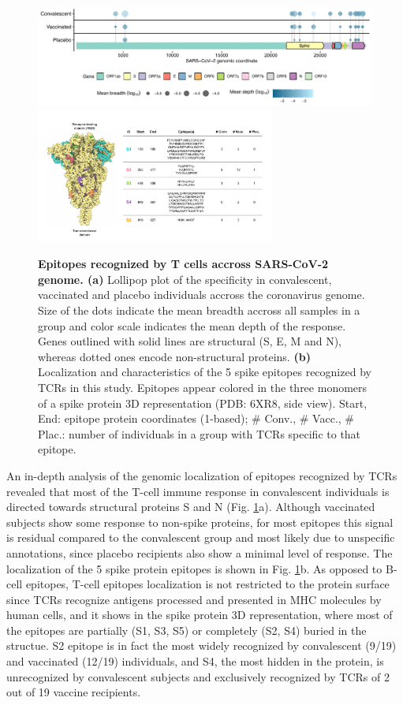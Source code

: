 \begin{figure}[t]
	\centering
	\includegraphics[width=\textwidth,keepaspectratio]{figures/hits.pdf}
	\includegraphics[width=0.7\textwidth,keepaspectratio]{figures/spike_w_table.pdf}
	\caption{\textbf{Epitopes recognized by T cells accross SARS-CoV-2 genome. (a)} Lollipop plot of the \TCRB{} \covid{} specificity in convalescent, vaccinated and placebo individuals accross the coronavirus genome. Size of the dots indicate the mean breadth accross all samples in a group and color scale indicates the mean depth of the response. Genes outlined with solid lines are structural (S, E, M and N), whereas dotted ones encode non-structural proteins. \textbf{(b)} Localization and characteristics of the 5 \covid{} spike epitopes recognized by TCRs in this study. Epitopes appear colored in the three monomers of a spike protein 3D representation (PDB: 6XR8, side view). Start, End: epitope protein coordinates (1-based); \# Conv., \# Vacc., \# Plac.: number of individuals in a group with TCRs specific to that epitope.}
	\label{fig:hits}
\end{figure}

An in-depth analysis of the genomic localization of \covid{} epitopes recognized by TCRs revealed that most of the T-cell immune response in convalescent individuals is directed towards structural proteins S and N (Fig. \ref{fig:hits}a). Although vaccinated subjects show some response to non-spike proteins, for most epitopes this signal is residual compared to the convalescent group and most likely due to unspecific annotations, since placebo recipients also show a minimal level of response. The localization of the 5 spike protein epitopes is shown in Fig. \ref{fig:hits}b. As opposed to B-cell epitopes, T-cell epitopes localization is not restricted to the protein surface since TCRs recognize antigens processed and presented in MHC molecules by human cells, and it shows in the spike protein 3D representation, where most of the epitopes are partially (S1, S3, S5) or completely (S2, S4) buried in the structue. S2 epitope is in fact the most widely recognized by convalescent (9/19) and vaccinated (12/19) individuals, and S4, the most hidden in the protein, is unrecognized by convalescent subjects and exclusively recognized by TCRs of 2 out of 19 vaccine recipients.




